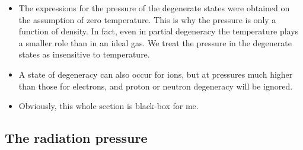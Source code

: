 \documentclass[10pt,amsmath,amssymb,aps,pra]{revtex4-2}
\begin{document}
\begin{itemize}
\item The expressions for the pressure of the degenerate states were obtained on
the assumption of zero temperature. This is why the pressure is only a function
of density. In fact, even in partial degeneracy the temperature plays a smaller
role than in an ideal gas. We treat the pressure in the degenerate states as
insensitive to temperature.

\item A state of degeneracy can also occur for ions, but at pressures much
higher than those for electrons, and proton or neutron degeneracy will be
ignored.

\item Obviously, this whole section is black-box for me.
\end{itemize}

\subsection{The radiation pressure}
\end{document}
